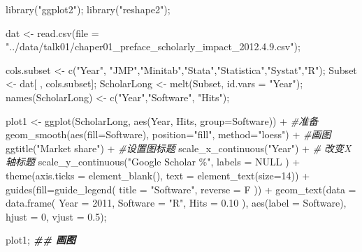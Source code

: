\documentclass[
]{ctexart}
\newenvironment{Shaded}{\begin{snugshade}}{\end{snugshade}}
\newcommand{\AttributeTok}[1]{\textcolor[rgb]{0.77,0.63,0.00}{#1}}
\newcommand{\CommentTok}[1]{\textcolor[rgb]{0.56,0.35,0.01}{\textit{#1}}}
\newcommand{\ConstantTok}[1]{\textcolor[rgb]{0.00,0.00,0.00}{#1}}
\newcommand{\DecValTok}[1]{\textcolor[rgb]{0.00,0.00,0.81}{#1}}
\newcommand{\DocumentationTok}[1]{\textcolor[rgb]{0.56,0.35,0.01}{\textbf{\textit{#1}}}}
\newcommand{\FloatTok}[1]{\textcolor[rgb]{0.00,0.00,0.81}{#1}}
\newcommand{\FunctionTok}[1]{\textcolor[rgb]{0.00,0.00,0.00}{#1}}
\newcommand{\NormalTok}[1]{#1}
\newcommand{\OtherTok}[1]{\textcolor[rgb]{0.56,0.35,0.01}{#1}}
\newcommand{\SpecialCharTok}[1]{\textcolor[rgb]{0.00,0.00,0.00}{#1}}
\newcommand{\StringTok}[1]{\textcolor[rgb]{0.31,0.60,0.02}{#1}}
\begin{document}
\begin{Shaded}
\begin{Highlighting}[]
\FunctionTok{library}\NormalTok{(}\StringTok{"ggplot2"}\NormalTok{); }\FunctionTok{library}\NormalTok{(}\StringTok{"reshape2"}\NormalTok{);}

\NormalTok{dat }\OtherTok{\textless{}{-}} \FunctionTok{read.csv}\NormalTok{(}\AttributeTok{file =} \StringTok{"../data/talk01/chaper01\_preface\_scholarly\_impact\_2012.4.9.csv"}\NormalTok{);}

\NormalTok{cols.subset }\OtherTok{\textless{}{-}} \FunctionTok{c}\NormalTok{(}\StringTok{"Year"}\NormalTok{, }\StringTok{"JMP"}\NormalTok{,}\StringTok{"Minitab"}\NormalTok{,}\StringTok{"Stata"}\NormalTok{,}\StringTok{"Statistica"}\NormalTok{,}\StringTok{"Systat"}\NormalTok{,}\StringTok{"R"}\NormalTok{);}
\NormalTok{Subset }\OtherTok{\textless{}{-}}\NormalTok{ dat[ , cols.subset];}
\NormalTok{ScholarLong }\OtherTok{\textless{}{-}} \FunctionTok{melt}\NormalTok{(Subset, }\AttributeTok{id.vars =} \StringTok{"Year"}\NormalTok{);}
\FunctionTok{names}\NormalTok{(ScholarLong) }\OtherTok{\textless{}{-}} \FunctionTok{c}\NormalTok{(}\StringTok{"Year"}\NormalTok{,}\StringTok{"Software"}\NormalTok{, }\StringTok{"Hits"}\NormalTok{);}

\NormalTok{plot1 }\OtherTok{\textless{}{-}} 
  \FunctionTok{ggplot}\NormalTok{(ScholarLong, }\FunctionTok{aes}\NormalTok{(Year, Hits, }\AttributeTok{group=}\NormalTok{Software)) }\SpecialCharTok{+} \CommentTok{\#准备}
    \FunctionTok{geom\_smooth}\NormalTok{(}\FunctionTok{aes}\NormalTok{(}\AttributeTok{fill=}\NormalTok{Software), }\AttributeTok{position=}\StringTok{"fill"}\NormalTok{, }\AttributeTok{method=}\StringTok{"loess"}\NormalTok{) }\SpecialCharTok{+} \CommentTok{\#画图}
    \FunctionTok{ggtitle}\NormalTok{(}\StringTok{"Market share"}\NormalTok{) }\SpecialCharTok{+} \CommentTok{\#设置图标题}
    \FunctionTok{scale\_x\_continuous}\NormalTok{(}\StringTok{"Year"}\NormalTok{) }\SpecialCharTok{+} \CommentTok{\# 改变X轴标题}
    \FunctionTok{scale\_y\_continuous}\NormalTok{(}\StringTok{"Google Scholar \%"}\NormalTok{, }\AttributeTok{labels =} \ConstantTok{NULL}\NormalTok{ ) }\SpecialCharTok{+}
    \FunctionTok{theme}\NormalTok{(}\AttributeTok{axis.ticks =} \FunctionTok{element\_blank}\NormalTok{(),  }\AttributeTok{text =} \FunctionTok{element\_text}\NormalTok{(}\AttributeTok{size=}\DecValTok{14}\NormalTok{)) }\SpecialCharTok{+} 
    \FunctionTok{guides}\NormalTok{(}\AttributeTok{fill=}\FunctionTok{guide\_legend}\NormalTok{( }\AttributeTok{title =} \StringTok{"Software"}\NormalTok{,  }\AttributeTok{reverse =}\NormalTok{ F )) }\SpecialCharTok{+} 
    \FunctionTok{geom\_text}\NormalTok{(}\AttributeTok{data =} \FunctionTok{data.frame}\NormalTok{( }\AttributeTok{Year =} \DecValTok{2011}\NormalTok{,  }\AttributeTok{Software =} \StringTok{"R"}\NormalTok{, }\AttributeTok{Hits =} \FloatTok{0.10}\NormalTok{ ),}
              \FunctionTok{aes}\NormalTok{(}\AttributeTok{label =}\NormalTok{ Software), }\AttributeTok{hjust =} \DecValTok{0}\NormalTok{, }\AttributeTok{vjust =} \FloatTok{0.5}\NormalTok{);}

\NormalTok{plot1; }\DocumentationTok{\#\# 画图}
\end{Highlighting}
\end{Shaded}
\end{document}
